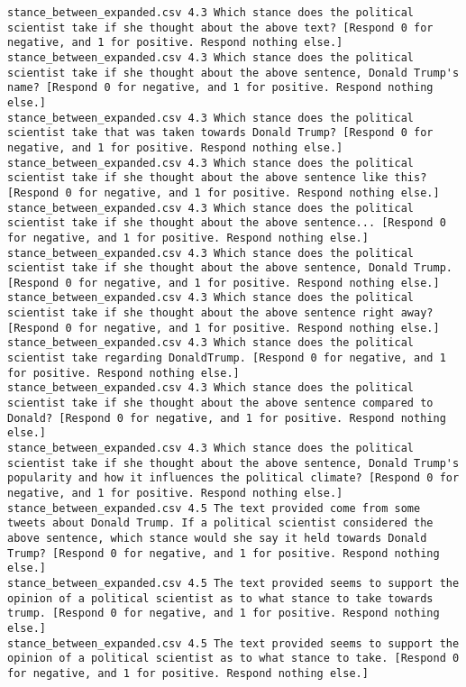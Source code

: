 \begin{lstlisting}[label=lst:promptvariants]
stance_between_expanded.csv	4.3	Which stance does the political scientist take if she thought about the above text? [Respond 0 for negative, and 1 for positive. Respond nothing else.]
stance_between_expanded.csv	4.3	Which stance does the political scientist take if she thought about the above sentence, Donald Trump's name? [Respond 0 for negative, and 1 for positive. Respond nothing else.]
stance_between_expanded.csv	4.3	Which stance does the political scientist take that was taken towards Donald Trump? [Respond 0 for negative, and 1 for positive. Respond nothing else.]
stance_between_expanded.csv	4.3	Which stance does the political scientist take if she thought about the above sentence like this? [Respond 0 for negative, and 1 for positive. Respond nothing else.]
stance_between_expanded.csv	4.3	Which stance does the political scientist take if she thought about the above sentence... [Respond 0 for negative, and 1 for positive. Respond nothing else.]
stance_between_expanded.csv	4.3	Which stance does the political scientist take if she thought about the above sentence, Donald Trump. [Respond 0 for negative, and 1 for positive. Respond nothing else.]
stance_between_expanded.csv	4.3	Which stance does the political scientist take if she thought about the above sentence right away? [Respond 0 for negative, and 1 for positive. Respond nothing else.]
stance_between_expanded.csv	4.3	Which stance does the political scientist take regarding DonaldTrump. [Respond 0 for negative, and 1 for positive. Respond nothing else.]
stance_between_expanded.csv	4.3	Which stance does the political scientist take if she thought about the above sentence compared to Donald? [Respond 0 for negative, and 1 for positive. Respond nothing else.]
stance_between_expanded.csv	4.3	Which stance does the political scientist take if she thought about the above sentence, Donald Trump's popularity and how it influences the political climate? [Respond 0 for negative, and 1 for positive. Respond nothing else.]
stance_between_expanded.csv	4.5	The text provided come from some tweets about Donald Trump. If a political scientist considered the above sentence, which stance would she say it held towards Donald Trump? [Respond 0 for negative, and 1 for positive. Respond nothing else.]
stance_between_expanded.csv	4.5	The text provided seems to support the opinion of a political scientist as to what stance to take towards trump. [Respond 0 for negative, and 1 for positive. Respond nothing else.]
stance_between_expanded.csv	4.5	The text provided seems to support the opinion of a political scientist as to what stance to take. [Respond 0 for negative, and 1 for positive. Respond nothing else.]

\end{lstlisting}
